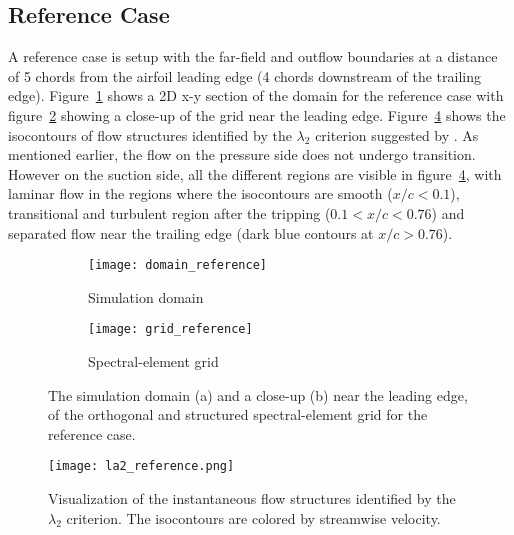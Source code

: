 \subsection{Reference Case}
A reference case is setup with the far-field and outflow boundaries at a distance of 5 chords from the airfoil leading edge (4 chords downstream of the trailing edge). Figure~\ref{fig:domain_reference} shows a 2D x-y section of the domain for the reference case with figure~\ref{fig:grid_reference} showing a close-up of the grid near the leading edge. Figure~\ref{fig:la2_reference} shows the isocontours of flow structures identified by the $\lambda_{2}$ criterion suggested by \cite{jeong95}. As mentioned earlier, the flow on the pressure side does not undergo transition. However on the suction side, all the different regions are visible in figure~\ref{fig:la2_reference}, with laminar flow in the regions where the isocontours are smooth ($x/c<0.1$), transitional and turbulent region after the tripping ($0.1<x/c<0.76$) and separated flow near the trailing edge (dark blue contours at $x/c>0.76$).
\begin{figure}[h]
	\centering
	\begin{subfigure}[b]{0.45\textwidth}
		\centering
		\texttt{[image: domain\_reference]}
		\caption{Simulation domain}
		\label{fig:domain_reference}
	\end{subfigure}
	\begin{subfigure}[b]{0.45\textwidth}
		\centering
		\texttt{[image: grid\_reference]}
		\caption{Spectral-element grid}
		\label{fig:grid_reference}
	\end{subfigure}
	\caption{The simulation domain (a) and a close-up (b) near the leading edge, of the orthogonal and structured spectral-element grid for the reference case.}
	\label{fig:domain_grid_reference}
\end{figure}

\begin{figure}[h]
	\centering
	\texttt{[image: la2\_reference.png]}
	\caption{Visualization of the instantaneous flow structures identified by the $\lambda_{2}$ criterion. The isocontours are colored by streamwise velocity.}
	\label{fig:la2_reference}
\end{figure}


